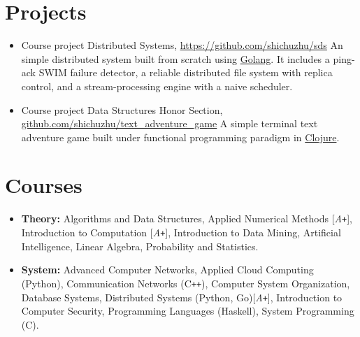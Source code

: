 \documentclass[11pt,a4paper,sans]{moderncv}        %
\begin{document}
\section{Projects}
\vspace{-5pt}
\begin{itemize}
	\item{
	      {Course project}
	      {\vspace{-10pt}}
	      {}
	      {Distributed Systems,
		      \href{https://github.com/shichuzhu/sds}
		      {\underline{https://github.com/shichuzhu/sds}}}
	      {
		      An simple distributed system built from scratch using \underline{Golang}.
		      It includes a ping-ack SWIM failure detector, a reliable distributed file system with replica control, and a stream-processing engine with a naive scheduler.
	      }}
	      
	\item{
	      {Course project}
	      {\vspace{-10pt}}
	      {}
	      {Data Structures Honor Section,
		      \href{https://github.com/shichuzhu/text_adventure_game}{\underline{github.com/shichuzhu/text\_adventure\_game}}
	      }
	      {
		      A simple terminal text adventure game built under functional programming paradigm in \underline{Clojure}.}
	      }
\end{itemize}

\vspace{-15pt}
\section{Courses}
\vspace{-5pt}
\begin{itemize}\small
	\item \textbf{Theory:}
	      Algorithms and Data Structures,
	      Applied Numerical Methods [\emph{A\texttt{+}}],
	      Introduction to Computation [\emph{A\texttt{+}}],
	      Introduction to Data Mining,
	      Artificial Intelligence,
	      Linear Algebra,
	      Probability and Statistics.
	\item \textbf{System:}
	      Advanced Computer Networks,
	      Applied Cloud Computing (Python),
	      Communication Networks (C\texttt{++}),
	      Computer System Organization,
	      Database Systems,
	      Distributed Systems (Python, Go)[\emph{A\texttt{+}}],
	      Introduction to Computer Security,
	      Programming Languages (Haskell),
	      System Programming (C).
\end{itemize}
\end{document}

